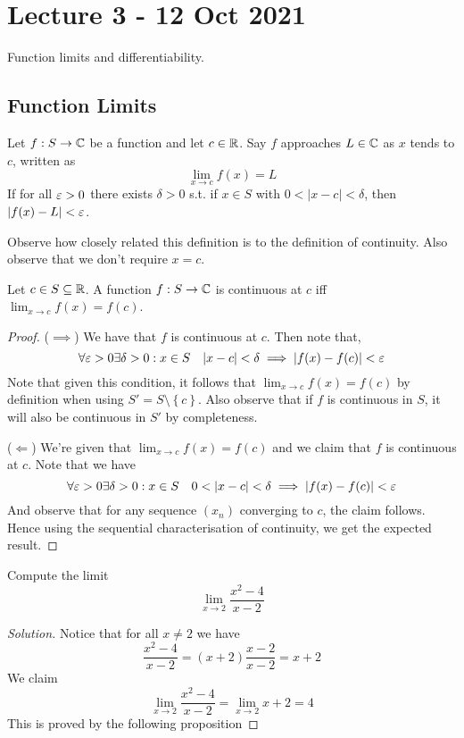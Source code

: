 \section{Lecture 3 - 12 Oct 2021}
Function limits and differentiability.
\subsection{Function Limits}
\begin{definition}
  Let $f:S\to\mathbb C$  be a function and let $c\in\mathbb R$. Say $f$ approaches $L\in\mathbb C$ as $x$
  tends to $c$, written as 
  \[\lim_{x\to c} f(x) = L\]
  If for all $\varepsilon>0$ there exists $\delta>0$ s.t. if $x\in S$ with $0<|x-c|<\delta$, then
  $|f(x)-L|<\varepsilon$.
  \label{def:functionLimit}
\end{definition}
Observe how closely related this definition is to the definition of continuity. Also
observe that we don't require $x=c$.
\begin{theorem}
  Let $c\in S\subseteq \mathbb R$. A function $f:S\to\mathbb C$ is continuous at $c$ iff
  $\lim_{x\to c}f(x)=f(c)$.
\end{theorem}
\begin{proof}
  ($\implies$) We have that $f$ is continuous at $c$. Then note that,
  \[\forall\varepsilon>0\exists\delta>0 : x\in S \quad |x-c|<\delta \implies|f(x)-f(c)|<\varepsilon\]
  Note that given this condition, it follows that $\lim_{x\to c} f(x)=f(c)$ by definition
  when using $S'=S\setminus \left\{ c \right\}$. Also observe that if $f$ is continuous in
  $S$, it will also be continuous in $S'$ by completeness.

  ($\Leftarrow$) We're given that $\lim_{x\to c} f(x)=f(c)$ and we claim that $f$ is
  continuous at $c$. Note that we have
  \[\forall\eps>0\exists\delta>0 : x\in S \quad 0<|x-c|<\delta \implies|f(x)-f(c)|<\eps\]
  And observe that for any sequence $(x_n)$ converging to $c$, the claim follows. Hence
  using the sequential characterisation of continuity, we get the expected result.
\end{proof}

\begin{example}
  Compute the limit
  \[\lim_{x\to 2} \frac{x^2-4}{x-2}\]
\end{example}
\begin{proof}[Solution]
  Notice that for all $x\neq 2$ we have
  \[\frac{x^2-4}{x-2} = (x+2) \frac{x-2}{x-2} = x+2\]
  We claim 
  \[\lim_{x\to 2} \frac{x^2-4}{x-2} = \lim_{x\to 2} x+2 = 4\]
  This is proved by the following proposition
\end{proof}

